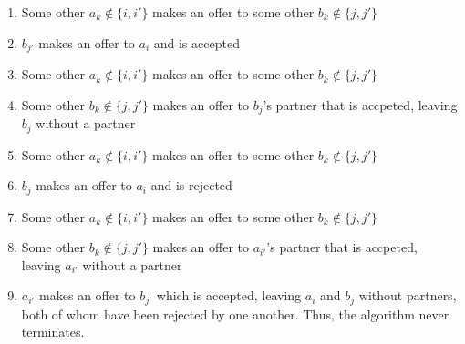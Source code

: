 \documentclass{article}
\begin{document}
\begin{enumerate}[a)]
\begin{enumerate}[1.]
        \item Some other $a_k \notin \{i, i'\}$ makes an offer to some other $b_k \notin \{j, j'\}$
        \item $b_{j'}$ makes an offer to $a_{i}$ and is accepted
        \item Some other $a_k \notin \{i, i'\}$ makes an offer to some other $b_k \notin \{j, j'\}$
        \item Some other $b_k \notin \{j, j'\}$ makes an offer to $b_j$'s partner that is accpeted, leaving $b_{j}$ without a partner
        \item Some other $a_k \notin \{i, i'\}$ makes an offer to some other $b_k \notin \{j, j'\}$
        \item $b_{j}$ makes an offer to $a_{i}$ and is rejected
        \item Some other $a_k \notin \{i, i'\}$ makes an offer to some other $b_k \notin \{j, j'\}$
        \item Some other $b_k \notin \{j, j'\}$ makes an offer to $a_{i'}$'s partner that is accpeted, leaving $a_{i'}$ without a partner
        \item $a_{i'}$ makes an offer to $b_{j'}$ which is accepted, leaving $a_i$ and $b_j$ without partners, both of whom have been rejected by one another. Thus, the algorithm never terminates.
    \end{enumerate}
\end{enumerate}
\end{document}
